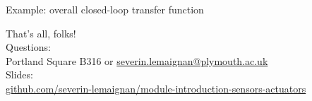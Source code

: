 \documentclass[compress]{beamer}
\begin{document}
{
    \begin{frame}{Example: overall closed-loop transfer function}
    \end{frame}
}


\begin{frame}{}
    \begin{center}
        \Large
        That's all, folks!\\[2em]
        \normalsize
        Questions:\\
        Portland Square B316 or \url{severin.lemaignan@plymouth.ac.uk} \\[1em]

        Slides:\\
        \href{https://github.com/severin-lemaignan/module-introduction-sensors-actuators}{\small
        github.com/severin-lemaignan/module-introduction-sensors-actuators}


    \end{center}
\end{frame}
\end{document}
